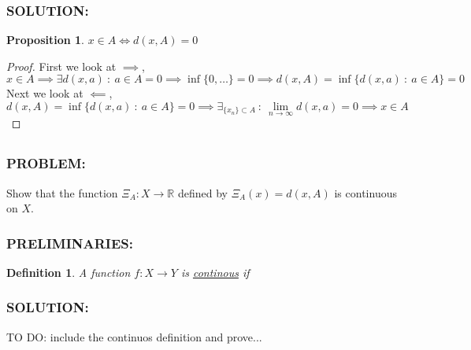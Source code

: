 \documentclass[]{article}
\newcommand{\Problem}{\subsubsection*{\textbf{PROBLEM:}}}
\newcommand{\Solution}{\subsubsection*{\textbf{SOLUTION:}}}
\newcommand{\Preliminaries}{\subsubsection*{\textbf{PRELIMINARIES:}}}
\newcommand{\R}{\mathbb{R}}
\newcommand{\st}{\ : \ }
\newtheorem{definition}{Definition}
\newtheorem{proposition}{Proposition}
\begin{document}
\Solution
\begin{proposition}
    $x \in A \iff d(x,A) = 0$
\end{proposition}
\begin{proof}
    First we look at $\implies$,\[
        x \in A \implies \exists d(x,a) \st a \in A = 0 \implies \inf\{0,\dots\} = 0 \implies d(x,A) = \inf\{d(x,a) \st a \in A\} = 0
    \] Next we look at $\impliedby$, \[
        d(x,A) = \inf\{d(x,a) \st a \in A\} = 0 \implies \exists_{\{x_n\} \subset A} \st \lim_{n\to \infty} d(x,a) = 0 \implies x \in A
    \]
\end{proof}

\subsection{}
\Problem
Show that the function $\Xi_A : X \to \R$ defined by $\Xi_A(x) = d(x,A)$ is continuous on $X$.

\Preliminaries
\begin{definition}
    A function $f : X \to Y$ is \emph{\underline{continous}} if 
\end{definition}

\Solution

TO DO: include the continuos definition and prove...
\end{document}
